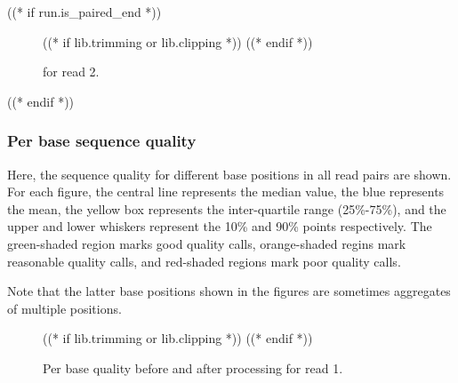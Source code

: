 ((* if run.is_paired_end *))
    \begin{figure}[h!]
        \centering
        \begin{minipage}[b]{0.48\textwidth}
            \centering
        \end{minipage}
        \begin{minipage}[b]{0.48\textwidth}
            \centering
            ((* if lib.trimming or lib.clipping *))
            ((* endif *))
        \end{minipage}
        \caption{\capSeqL for read 2.}
    \end{figure}
((* endif *))

\subsubsection{Per base sequence quality}
\newcommand{\capBaseQ}{Per base quality before and after processing }
    Here, the sequence quality for different base positions in all read pairs
    are shown. For each figure, the central line represents the median value,
    the blue represents the mean, the yellow box represents the inter-quartile
    range (25\%-75\%), and the upper and lower whiskers represent the 10\% and
    90\% points respectively. The green-shaded region marks good quality calls,
    orange-shaded regins mark reasonable quality calls, and red-shaded regions
    mark poor quality calls.

    \indent

    Note that the latter base positions shown in the figures are
    sometimes aggregates of multiple positions.
    \begin{figure}[h!]
        \centering
        \begin{minipage}[b]{0.48\textwidth}
            \centering
        \end{minipage}
        \begin{minipage}[b]{0.48\textwidth}
            \centering
            ((* if lib.trimming or lib.clipping *))
            ((* endif *))
        \end{minipage}
        \caption{\capBaseQ for read 1.}
    \end{figure}

